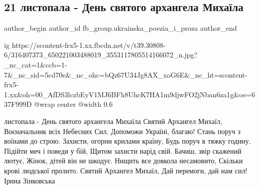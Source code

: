  
 
 
 
 
 
\subsection{21 листопала - День святого архангела Михаїла}
\label{sec:21_11_2022.fb.fb_group.ukrainska_poezia_i_proza.1.arhangel_mihail}
 
\ifcmt
 author_begin
   author_id fb_group.ukrainska_poezia_i_proza
 author_end
\fi

\ifcmt
  ig https://scontent-frx5-1.xx.fbcdn.net/v/t39.30808-6/316407373_650221003488019_3553117805514166072_n.jpg?_nc_cat=1&ccb=1-7&_nc_sid=5cd70e&_nc_ohc=bQz67U34Jg8AX_xoG6E&_nc_ht=scontent-frx5-1.xx&oh=00_AfDS3lczbEyV1MJ6BFh8UhcK7HA1m9djwFO2jNban6za1g&oe=637F999D
  @wrap center
  @width 0.6
\fi

\obeycr
{} листопала - День святого архангела Михаїла
\smallskip
Святий Архангел Михаїл,
Воєначальник всіх Небесних Сил.
Допоможи Україні, благаю!
Стань поруч з воїнами до строю.
Захисти, огорни крилами країну,
Будь поруч в тяжку годину.
Підійти меч і поведи у бій,
Щитом захисти нарід свій.
Бачиш, звір скажений лютує,
Жінок, дітей він не шкодує.
Нищить все довкола несамовито,
Скільки крові людської пролито.
Святий Архангел Михаїл,
Дай перемоги, дай нам сил! 
\smallskip
Ірина Зінковська
\restorecr


